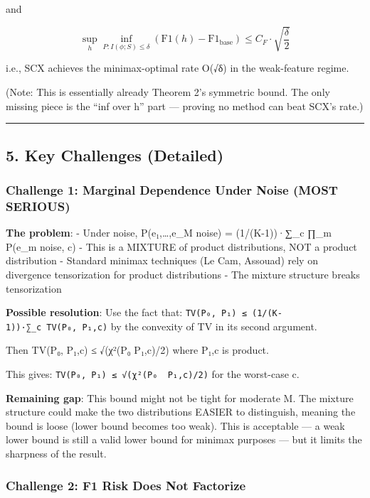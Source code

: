 \documentclass[
  12pt,
]{ctexart}
\begin{document}
and

\[\sup_{h} \inf_{P: I(\phi;S) \leq \delta} \left(\text{F1}(h) - \text{F1}_{\text{base}}\right) \leq C_F \cdot \sqrt{\frac{\delta}{2}}\]

i.e., SCX achieves the minimax-optimal rate O(√δ) in the weak-feature
regime.

(Note: This is essentially already Theorem 2's symmetric bound. The only
missing piece is the ``inf over h'' part --- proving no method can beat
SCX's rate.)

\begin{center}\rule{0.5\linewidth}{0.5pt}\end{center}

\subsection{5. Key Challenges (Detailed)}\label{key-challenges-detailed}

\subsubsection{Challenge 1: Marginal Dependence Under Noise (MOST
SERIOUS)}\label{challenge-1-marginal-dependence-under-noise-most-serious}

\textbf{The problem}: - Under noise, P(e₁,\ldots,e\_M \textbar{} noise)
= (1/(K-1))·∑\_c ∏\_m P(e\_m \textbar{} noise, c) - This is a MIXTURE of
product distributions, NOT a product distribution - Standard minimax
techniques (Le Cam, Assouad) rely on divergence tensorization for
product distributions - The mixture structure breaks tensorization

\textbf{Possible resolution}: Use the fact that:
\texttt{TV(P₀,\ P₁)\ ≤\ (1/(K-1))·∑\_c\ TV(P₀,\ P₁,c)} by the convexity
of TV in its second argument.

Then TV(P₀, P₁,c) ≤ √(χ²(P₀ \textbar\textbar{} P₁,c)/2) where P₁,c is
product.

This gives:
\texttt{TV(P₀,\ P₁)\ ≤\ √(χ²(P₀\ \textbar{}\textbar{}\ P₁,c)/2)} for the
worst-case c.

\textbf{Remaining gap}: This bound might not be tight for moderate M.
The mixture structure could make the two distributions EASIER to
distinguish, meaning the bound is loose (lower bound becomes too weak).
This is acceptable --- a weak lower bound is still a valid lower bound
for minimax purposes --- but it limits the sharpness of the result.

\subsubsection{Challenge 2: F1 Risk Does Not
Factorize}\label{challenge-2-f1-risk-does-not-factorize}
\end{document}
